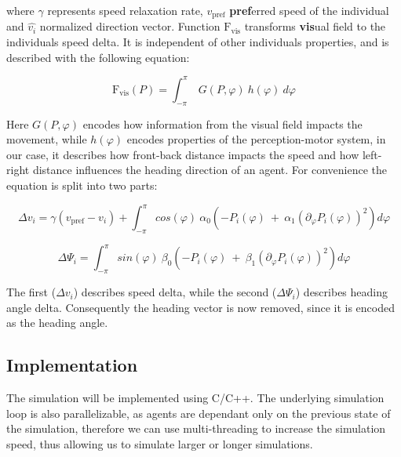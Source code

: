 \documentclass[9pt]{pnas-new}
\begin{document}
where $\gamma$ represents speed relaxation rate, $v_\text{pref}$ \textbf{pref}erred speed of the individual and $\hat{v_i}$ normalized direction vector.
Function $\text{F}_{\text{vis}}$ transforms \textbf{vis}ual field to the individuals speed delta.
It is independent of other individuals properties, and is described with the following equation:

\begin{equation}
    \text{F}_{\text{vis}}(P) = \int_{-\pi}^{\pi} \ G(P, \varphi) \ h(\varphi) \ d\varphi
\end{equation}

Here $G(P, \varphi)$ encodes how information from the visual field impacts the movement, while $h(\varphi)$ encodes properties of the perception-motor system, in our case, it describes how front-back distance impacts the speed and how left-right distance influences the heading direction of an agent.
For convenience the equation is split into two parts:
\sloppy

\begin{equation}
    \Delta v_i = \gamma(v_\text{pref} - v_i) +
        \int_{-\pi}^{\pi} cos(\varphi) \ \alpha_0
        \left(
            -P_i(\varphi) \ + \ \alpha_1 (\partial_{\varphi} P_i(\varphi))^2
        \right) d\varphi
\end{equation}


\begin{equation}
    \Delta \Psi_i =
        \int_{-\pi}^{\pi}
        sin(\varphi) \ \beta_0
        \left(
            -P_i(\varphi) \ + \ \beta_1 (\partial_{\varphi} P_i(\varphi))^2
        \right) d\varphi
\end{equation}

The first ($\Delta v_i$) describes speed delta, while the second ($\Delta \Psi_i$) describes heading angle delta.
Consequently the heading vector is now removed, since it is encoded as the heading angle.







\subsection{Implementation}

The simulation will be implemented using C/C++.
The underlying simulation loop is also parallelizable, as agents are dependant only on the previous state of the simulation, therefore we can use multi-threading to increase the simulation speed, thus allowing us to simulate larger or longer simulations.
\end{document}
